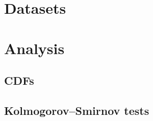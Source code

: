 
\section{Datasets}
\label{Results:Datasets}

\section{Analysis}
\label{Results:Analysis}

    \subsection{CDFs}
    \label{Results:Analysis:CDFs}

    \subsection{Kolmogorov–Smirnov tests}
    \label{Results:Analysis:Kolmogorov_Smirnov_tests}
